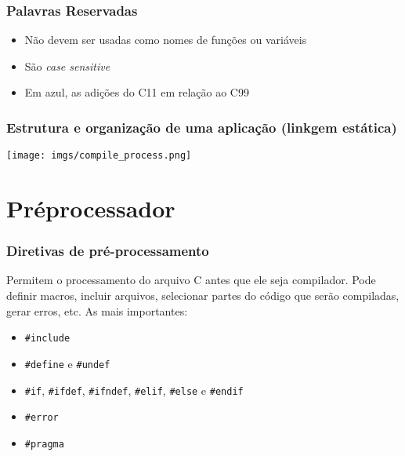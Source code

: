\documentclass{beamer}
\begin{document}
\begin{frame}
	\frametitle{Palavras Reservadas}
	\begin{itemize}
	\item Não devem ser usadas como nomes de funções ou variáveis
	\item São \textit{case sensitive}
	\item Em azul, as adições do C11 em relação ao C99
\end{itemize}
\vspace*{0.5cm}
\end{frame}


\begin{frame}
	\frametitle{Estrutura e organização de uma aplicação (linkgem estática)}
		\texttt{[image: imgs/compile\_process.png]}
\end{frame}

\section{Préprocessador}

\begin{frame}
	\frametitle{Diretivas de pré-processamento}
	Permitem o processamento do arquivo C antes que ele seja compilador. Pode definir macros, incluir arquivos, selecionar partes do código que serão compiladas, gerar erros, etc. As mais importantes:
\vspace*{0.5cm}
\begin{itemize}
	\item \texttt{\#include}
	\item \texttt{\#define} e \texttt{\#undef} 
	\item \texttt{\#if}, \texttt{\#ifdef}, \texttt{\#ifndef}, \texttt{\#elif}, \texttt{\#else} e \texttt{\#endif}
	\item \texttt{\#error}
	\item \texttt{\#pragma}
\end{itemize}
\end{frame}
\end{document}
